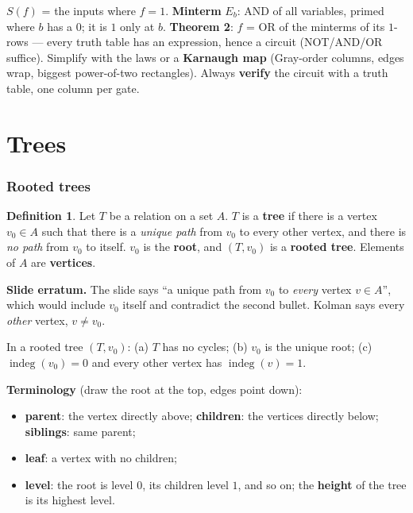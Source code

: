 \documentclass{fkt-notes}
\newcommand{\erratum}[1]{\par\noindent\textbf{Slide erratum.} #1\par}
\newcommand{\src}[1]{\par\noindent{\small\itshape Source: #1}\par\smallskip}
\newcommand{\kolman}[1]{\setcounter{section}{\numexpr#1-1\relax}}
\theoremstyle{definition}
\newtheorem*{defn}{Definition}
\begin{document}
\begin{keybox}[title=Key points (6.6)]
  $S(f)$ = the inputs where $f=1$. \textbf{Minterm} $E_b$: AND of all
  variables, primed where $b$ has a $0$; it is $1$ only at $b$.
  \textbf{Theorem 2}: $f$ = OR of the minterms of its $1$-rows --- every
  truth table has an expression, hence a circuit (NOT/AND/OR suffice).
  Simplify with the laws or a \textbf{Karnaugh map} (Gray-order columns,
  edges wrap, biggest power-of-two rectangles). Always \textbf{verify}
  the circuit with a truth table, one column per gate.
\end{keybox}

\newpage
\part{Trees}

\kolman{1}
\section{Rooted trees}\src{Kolman 7.1}
%

\begin{defn}
  Let $T$ be a relation on a set $A$. $T$ is a \textbf{tree} if there is a
  vertex $v_0\in A$ such that there is a \emph{unique path} from $v_0$ to
  every other vertex, and there is \emph{no path} from $v_0$ to itself.
  $v_0$ is the \textbf{root}, and $(T,v_0)$ is a \textbf{rooted tree}.
  Elements of $A$ are \textbf{vertices}.
\end{defn}
\erratum{The slide says ``a unique path from $v_0$ to \emph{every}
  vertex $v\in A$'', which would include $v_0$ itself and contradict the
  second bullet. Kolman says every \emph{other} vertex, $v\neq v_0$.}

\begin{rulebox}[title={7.1 Theorem 1}]
  In a rooted tree $(T,v_0)$: (a) $T$ has no cycles; (b) $v_0$ is the
  unique root; (c) $\operatorname{indeg}(v_0)=0$ and every other vertex has
  $\operatorname{indeg}(v)=1$.
\end{rulebox}

\textbf{Terminology} (draw the root at the top, edges point down):
\begin{itemize}[nosep]
  \item \textbf{parent}: the vertex directly above; \textbf{children}:
        the vertices directly below; \textbf{siblings}: same parent;
  \item \textbf{leaf}: a vertex with no children;
  \item \textbf{level}: the root is level $0$, its children level $1$, and
        so on; the \textbf{height} of the tree is its highest level.
\end{itemize}
\end{document}
